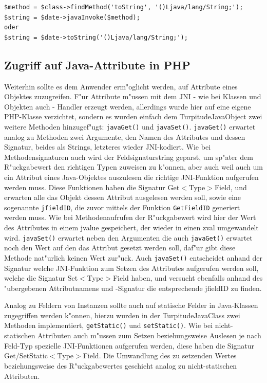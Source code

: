 \begin{lstlisting}[caption=Zwei Arten die gleiche Methode aufzurufen]
$method = $class->findMethod('toString', '()Ljava/lang/String;');
$string = $date->javaInvoke($method);
oder
$string = $date->toString('()Ljava/lang/String;');
\end{lstlisting}

\subsection{Zugriff auf Java-Attribute in PHP}
\label{sec:chap1:impl:7}

Weiterhin sollte es dem Anwender erm"oglicht werden, auf Attribute eines Objektes zuzugreifen. F"ur Attribute m"ussen mit dem JNI - wie bei Klassen und Objekten auch -
Handler erzeugt werden, allerdings wurde hier auf eine eigene PHP-Klasse verzichtet, sondern es wurden einfach dem TurpitudeJavaObject zwei weitere Methoden hinzugef"ugt: 
\texttt{javaGet()} und \texttt{javaSet()}. \texttt{javaGet()} erwartet analog zu Methoden zwei Argumente, den Namen des Attributes und dessen Signatur, beides als Strings, 
letzteres wieder JNI-kodiert. Wie bei Methodensignaturen auch wird der Feldsignaturstring geparst, um sp"ater dem R"uckgabewert den richtigen Typen zuweisen zu k"onnen, 
aber auch weil auch um ein Attribut eines Java-Objektes auszulesen die richtige JNI-Funktion aufgerufen werden muss. Diese Funktionen haben die Signatur
Get$<$Type$>$Field, und erwarten alle das Objekt dessen Attribut ausgelesen werden soll, sowie eine sogenannte \texttt{jfieldID}, die zuvor mittels der Funktion
\texttt{GetFieldID} generiert werden muss. Wie bei Methodenaufrufen der R"uckgabewert wird hier der Wert des Attributes in einem jvalue gespeichert, der wieder
in einen zval umgewandelt wird. \texttt{javaSet()} erwartet neben den Argumenten die auch \texttt{javaGet()} erwartet noch den Wert auf den das Attribut gesetzt werden
soll, daf"ur gibt diese Methode nat"urlich keinen Wert zur"uck. Auch \texttt{javaSet()} entscheidet anhand der Signatur welche JNI-Funktion zum Setzen des
Attributes aufgerufen werden soll, welche die Signatur Set$<$Type$>$Field haben, und versucht ebenfalls anhand des "ubergebenen Attributnamens und -Signatur die
entsprechende jfieldID zu finden.

Analog zu Feldern von Instanzen sollte auch auf statische Felder in Java-Klassen zugegriffen werden k"onnen, hierzu wurden in der TurpitudeJavaClass zwei Methoden
implementiert, \texttt{getStatic()} und \texttt{setStatic()}. Wie bei nicht-statischen Attributen auch m"ussen zum Setzen beziehungsweise Auslesen je nach Feld-Typ spezielle 
JNI-Funktionen aufgerufen werden, diese haben die Signatur Get/SetStatic$<$Type$>$Field. Die Umwandlung des zu setzenden Wertes beziehungsweise des R"uckgabewertes
geschieht analog zu nicht-statischen Attributen.

